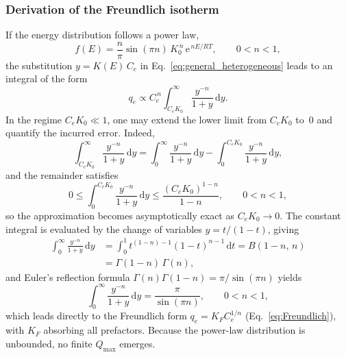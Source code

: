	\subsubsection{Derivation of the Freundlich isotherm}

	If the energy distribution follows a power law,
	\begin{equation}
		f(E) = \frac{n}{\pi}\sin(\pi n)\,
		K_0^{\,n}\, \mathrm{e}^{\,nE/RT},
		\qquad 0 < n < 1,
	\end{equation}
	the substitution $y = K(E)\,C_e$ in Eq.~\eqref{eq:general_heterogeneous}
	leads to an integral of the form
	\begin{equation}
		q_e \propto C_e^{\,n}
		\int_{C_e K_0}^{\infty} \frac{y^{-n}}{1 + y}\,\mathrm{d}y.
		\label{eq:freundlich_derivation_step}
	\end{equation}
	In the regime $C_e K_0 \ll 1$, one may extend the lower limit from
	$C_e K_0$ to~$0$ and quantify the incurred error. Indeed,
	\begin{equation}
		\int_{C_e K_0}^{\infty} \frac{y^{-n}}{1+y}\, \mathrm{d}y
		=
		\int_{0}^{\infty} \frac{y^{-n}}{1+y}\, \mathrm{d}y
		-
		\int_{0}^{C_e K_0} \frac{y^{-n}}{1+y}\, \mathrm{d}y,
	\end{equation}
	and the remainder satisfies
	\begin{equation}
		0 \le \int_{0}^{C_e K_0} \frac{y^{-n}}{1+y}\, \mathrm{d}y
		\le \frac{(C_e K_0)^{1-n}}{1-n},
		\qquad 0<n<1,
	\end{equation}
	so the approximation becomes asymptotically exact as $C_e K_0 \to 0$.
	The constant integral is evaluated by the change of variables
	$y = t/(1-t)$, giving
	\begin{align}
		\int_{0}^{\infty} \frac{y^{-n}}{1+y}\, \mathrm{d}y
		&= \int_{0}^{1} t^{(1-n)-1}(1-t)^{n-1}\, \mathrm{d}t
		= B(1-n,\,n) \nonumber\\
		&= \Gamma(1-n)\,\Gamma(n),
		\label{eq:beta_integral_gamma}
	\end{align}
	and Euler's reflection formula $\Gamma(n)\Gamma(1-n) = \pi/\sin(\pi n)$
	yields
	\begin{equation}
		\int_{0}^{\infty} \frac{y^{-n}}{1+y}\, \mathrm{d}y
		= \frac{\pi}{\sin(\pi n)}, \qquad 0<n<1,
		\label{eq:beta_integral}
	\end{equation}
	which leads directly to the Freundlich form
	$q_e = K_F C_e^{1/n}$ (Eq.~\eqref{eq:Freundlich}),
	with $K_F$ absorbing all prefactors. Because the power-law distribution
	is unbounded, no finite $Q_{\max}$ emerges.

